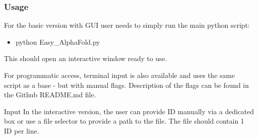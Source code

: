 \documentclass[10pt]{beamer}
\begin{document}
\begin{frame}
\frametitle{Usage}

For the basic version with GUI user needs to simply run the main python script:
\begin{itemize}
\item python Easy\_AlphaFold.py
\end{itemize}

This should open an interactive window ready to use. \newline\newline

For programmatic access, terminal input is also available and uses the same script as a base - but with manual flags.\newline
Description of the flags can be found in the Github README.md file.\newline\newline

Input\newline
In the interactive version, the user can provide ID manually via a dedicated box or use a file selector to provide a path to the file. The file should contain 1 ID per line.
\end{frame}


\begin{frame}
\frametitle{}
\end{frame}
\end{document}
